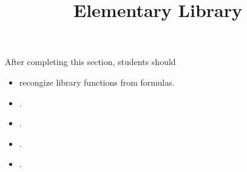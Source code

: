 \documentclass{ximera}
\title{Elementary Library}
\begin{document}
\begin{abstract}
\end{abstract}
\maketitle

\begin{sectionOutcomes}
After completing this section, students should 

\begin{itemize}
\item recongize library functions from formulas.
\item .
\item .
\item .
\item .
\end{itemize}
\end{sectionOutcomes}
\end{document}
